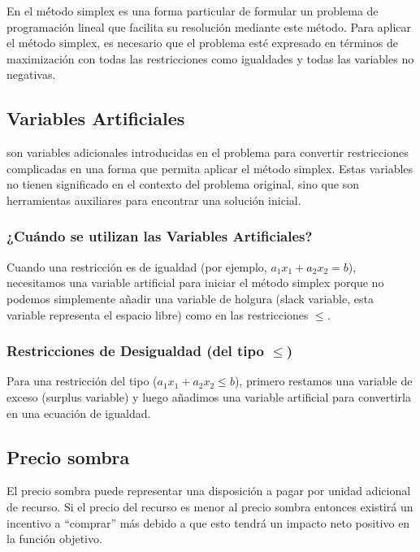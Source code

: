 \documentclass[conference]{IEEEtran}
\begin{document}
En el método simplex es una forma particular de formular un problema de
programación lineal que facilita su resolución mediante este método. Para
aplicar el método simplex, es necesario que el problema esté expresado en
términos de maximización con todas las restricciones como igualdades y todas
las variables no negativas.

\subsection{Variables Artificiales}

son variables adicionales introducidas en el problema para convertir
restricciones complicadas en una forma que permita aplicar el método
simplex. Estas variables no tienen significado en el contexto del problema
original, sino que son herramientas auxiliares para encontrar una
solución inicial.

\subsubsection*{¿Cuándo se utilizan las Variables Artificiales?}

Cuando una restricción es de igualdad (por ejemplo,
$a_{1}x_{1} + a_{2}x_{2} = b$), necesitamos una
variable artificial para iniciar el método simplex porque no podemos
simplemente añadir una variable de holgura (slack variable, esta variable
representa el espacio libre) como en las
restricciones $\leq$.

\subsubsection*{Restricciones de Desigualdad (del tipo $\leq$)}

Para una restricción del tipo ($a_{1}x_{1} + a_{2}x_{2} \leq b$), primero restamos una variable de
exceso (surplus variable) y luego añadimos una variable artificial para
convertirla en una ecuación de igualdad.

\subsection{Precio sombra}

El precio sombra puede representar una disposición a pagar por unidad
adicional de recurso. Si el precio del recurso es menor al precio sombra
entonces existirá un incentivo a ``comprar'' más debido a que esto tendrá un
impacto neto positivo en la función objetivo.
\end{document}
